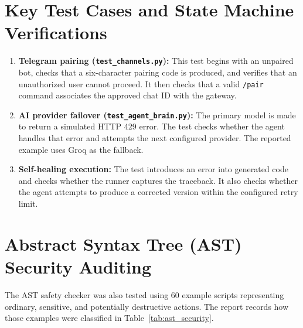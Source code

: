 \documentclass[12pt,letterpaper,oneside]{report}
\begin{document}
\section{Key Test Cases and State Machine Verifications}
\begin{enumerate}
    \item \textbf{Telegram pairing (\texttt{test\_channels.py}):} This test begins with an unpaired bot, checks that a six-character pairing code is produced, and verifies that an unauthorized user cannot proceed. It then checks that a valid \texttt{/pair} command associates the approved chat ID with the gateway.
    \item \textbf{AI provider failover (\texttt{test\_agent\_brain.py}):} The primary model is made to return a simulated HTTP 429 error. The test checks whether the agent handles that error and attempts the next configured provider. The reported example uses Groq as the fallback.
    \item \textbf{Self-healing execution:} The test introduces an error into generated code and checks whether the runner captures the traceback. It also checks whether the agent attempts to produce a corrected version within the configured retry limit.
\end{enumerate}

\section{Abstract Syntax Tree (AST) Security Auditing}
The AST safety checker was also tested using 60 example scripts representing ordinary, sensitive, and potentially destructive actions. The report records how those examples were classified in Table~\ref{tab:ast_security}.
\end{document}
